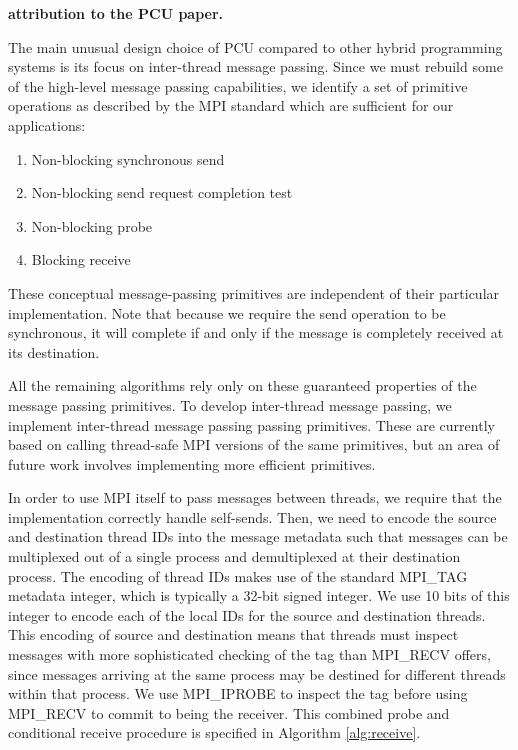 {\bf attribution to the PCU paper.}

The main unusual design choice of PCU compared to
other hybrid programming systems is
its focus on inter-thread message passing.
Since we must rebuild some of the high-level message
passing capabilities, we identify a set of primitive
operations as described by the MPI standard \cite{walker1996mpi}
which are sufficient for our applications:

\begin{enumerate}
\item Non-blocking synchronous send
\item Non-blocking send request completion test
\item Non-blocking probe
\item Blocking receive
\end{enumerate}

These conceptual message-passing primitives are independent
of their particular implementation.
Note that because we require the send operation to be synchronous,
it will complete if and only if the message is completely received at its
destination.

All the remaining algorithms rely only on these guaranteed properties
of the message passing primitives.
To develop inter-thread message passing, we implement inter-thread
message passing passing primitives.
These are currently based on calling thread-safe MPI versions of the
same primitives, but an area of future work involves implementing
more efficient primitives.

In order to use MPI itself to pass messages between threads, we require
that the implementation correctly handle self-sends.
Then, we need to encode the source and destination thread IDs into the message
metadata such that messages can be multiplexed out of a single process
and demultiplexed at their destination process.
The encoding of thread IDs makes use of the standard MPI\_TAG metadata
integer, which is typically a 32-bit signed integer.
We use 10 bits of this integer to encode each of the local IDs for the
source and destination threads.
This encoding of source and destination means that threads must inspect
messages with more sophisticated checking of the tag than MPI\_RECV
offers, since messages arriving at the same process may be destined
for different threads within that process.
We use MPI\_IPROBE to inspect the tag before using MPI\_RECV to commit
to being the receiver.
This combined probe and conditional receive procedure is specified
in Algorithm \ref{alg:receive}.

